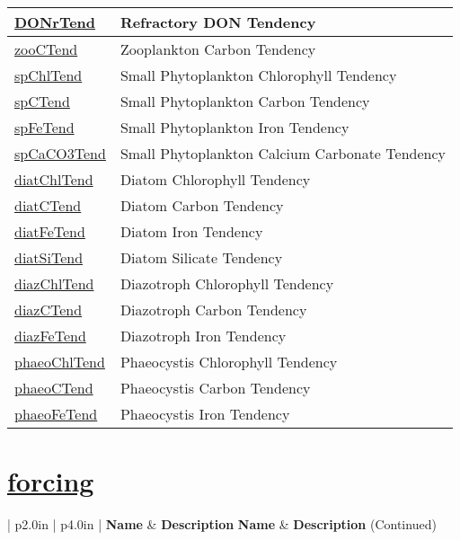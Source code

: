 {\begin{center}
\begin{longtable}{| p{2.0in} | p{4.0in} |}
    \hline
    \hyperref[subsec:var_sec_tracersTend_DONrTend]{DONrTend} & Refractory DON Tendency \\
    \hline
    \hyperref[subsec:var_sec_tracersTend_zooCTend]{zooCTend} & Zooplankton Carbon Tendency \\
    \hline
    \hyperref[subsec:var_sec_tracersTend_spChlTend]{spChlTend} & Small Phytoplankton Chlorophyll Tendency \\
    \hline
    \hyperref[subsec:var_sec_tracersTend_spCTend]{spCTend} & Small Phytoplankton Carbon Tendency \\
    \hline
    \hyperref[subsec:var_sec_tracersTend_spFeTend]{spFeTend} & Small Phytoplankton Iron Tendency \\
    \hline
    \hyperref[subsec:var_sec_tracersTend_spCaCO3Tend]{spCaCO3Tend} & Small Phytoplankton Calcium Carbonate Tendency \\
    \hline
    \hyperref[subsec:var_sec_tracersTend_diatChlTend]{diatChlTend} & Diatom Chlorophyll Tendency \\
    \hline
    \hyperref[subsec:var_sec_tracersTend_diatCTend]{diatCTend} & Diatom Carbon Tendency \\
    \hline
    \hyperref[subsec:var_sec_tracersTend_diatFeTend]{diatFeTend} & Diatom Iron Tendency \\
    \hline
    \hyperref[subsec:var_sec_tracersTend_diatSiTend]{diatSiTend} & Diatom Silicate Tendency \\
    \hline
    \hyperref[subsec:var_sec_tracersTend_diazChlTend]{diazChlTend} & Diazotroph Chlorophyll Tendency \\
    \hline
    \hyperref[subsec:var_sec_tracersTend_diazCTend]{diazCTend} & Diazotroph Carbon Tendency \\
    \hline
    \hyperref[subsec:var_sec_tracersTend_diazFeTend]{diazFeTend} & Diazotroph Iron Tendency \\
    \hline
    \hyperref[subsec:var_sec_tracersTend_phaeoChlTend]{phaeoChlTend} & Phaeocystis Chlorophyll Tendency \\
    \hline
    \hyperref[subsec:var_sec_tracersTend_phaeoCTend]{phaeoCTend} & Phaeocystis Carbon Tendency \\
    \hline
    \hyperref[subsec:var_sec_tracersTend_phaeoFeTend]{phaeoFeTend} & Phaeocystis Iron Tendency \\
    \hline
\end{longtable}
\end{center}
}
\section[forcing]{\hyperref[sec:var_sec_forcing]{forcing}}
\label{sec:var_tab_forcing}

\vspace{0.5in}
{\small
\begin{center}
\begin{longtable}{| p{2.0in} | p{4.0in} |}
    \hline
    {\bf Name} & {\bf Description} \endfirsthead
    \hline 
    {\bf Name} & {\bf Description} (Continued) \endhead
    \hline
\end{longtable}
\end{center}
}

